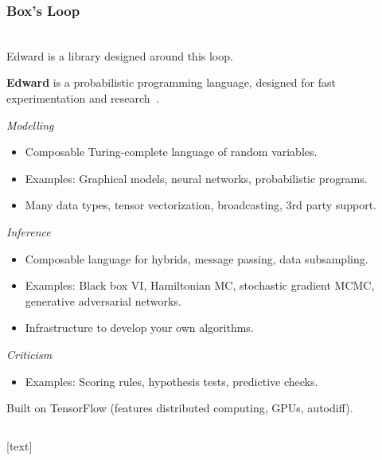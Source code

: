 \documentclass[10pt]{beamer}
\begin{document}
\begin{frame}
\frametitle{Box's Loop}
\center
{} \\
\vspace{20pt}
Edward is a library designed around this loop. \\
\citep{box_science_1976-1, box_sampling_1980-1, david_m._blei_build_2014}
\end{frame}


\begin{frame}
\vspace{3ex}
\textbf{Edward} is a probabilistic programming language,
designed for fast experimentation and research~\citep{tran_deep_2017}.

\emph{Modelling}
\begin{itemize}
\item Composable Turing-complete language of random variables.
\item Examples: Graphical models, neural networks, probabilistic programs.
\item Many data types, tensor vectorization, broadcasting, 3rd party support.
\end{itemize}

\emph{Inference}
\begin{itemize}
\item Composable language for hybrids, message passing, data subsampling.
\item Examples: Black box VI, Hamiltonian MC, stochastic gradient MCMC,
  generative adversarial networks.
\item Infrastructure to develop your own algorithms.
\end{itemize}

\emph{Criticism}
\begin{itemize}
\item Examples: Scoring rules, hypothesis tests, predictive checks.
\end{itemize}

\vspace{1ex}
Built on TensorFlow (features distributed computing, GPUs, autodiff).
\end{frame}

\begin{frame}[fragile]
\inputminted{python}{beta-bernoulli.py}
\end{frame}

\begin{frame}[allowframebreaks]%
[text]

\renewcommand*{\bibfont}{\small}
\printbibliography
\end{frame}
\end{document}
